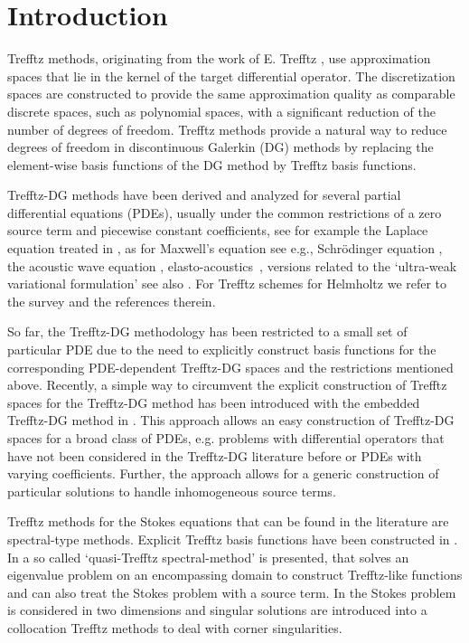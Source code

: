 \documentclass[pdflatex,sn-mathphys,Numbered]{sn-jnl}%
\theoremstyle{remark}%
\theoremstyle{definition}%
\begin{document}
\section{Introduction}
Trefftz methods, originating from the work of E. Trefftz
\cite{trefftz1926}, use approximation spaces that lie in the kernel of
the target differential operator. The discretization spaces are
constructed to provide the same approximation quality as comparable
discrete spaces, such as polynomial spaces, with a significant
reduction of the number of degrees of freedom. Trefftz methods provide
a natural way to reduce degrees of freedom in discontinuous Galerkin
(DG) methods by replacing the element-wise basis functions of the DG
method by Trefftz basis functions. 

Trefftz-DG methods have been derived and analyzed for several partial
differential equations (PDEs), usually under the common restrictions of
a zero source term and piecewise constant coefficients, see for
example the Laplace equation treated in \cite{HMPS14},
as
for Maxwell's equation see e.g.\cite{EKSW15, Huttunen}, Schr\"odinger
equation \cite{2306.09571,21M1426079}, the acoustic wave equation
\cite{mope18,bgl2016}, elasto-acoustics~\cite{bcds20}, versions
related to the `ultra-weak variational formulation' see also
\cite{SpaceTimeTDG,mope18,bcds20,KSTW2014,EKSW15,tpwave}.
For Trefftz schemes for Helmholtz we refer to the survey
\cite{TrefftzSurvey} and the references therein.

So far, the Trefftz-DG methodology has been restricted to a small set
of particular PDE due to the need to explicitly construct basis
functions for the corresponding PDE-dependent Trefftz-DG spaces and
the restrictions mentioned above.  
Recently, a simple way to circumvent the explicit construction of
Trefftz spaces for the Trefftz-DG method has been introduced with the
embedded Trefftz-DG method in \cite{2201.07041}. This approach allows
an easy construction of Trefftz-DG spaces for a broad class of PDEs,
e.g. problems with differential operators that have not been
considered in the Trefftz-DG literature before or PDEs with varying
coefficients. Further, the approach allows for a generic construction
of particular solutions to handle inhomogeneous source terms.

Trefftz methods for the Stokes equations that can be found in the
literature are spectral-type methods. Explicit Trefftz basis functions
have been constructed in \cite{POITOU2000561,Bouberbachene}. In
\cite{LifitsQTSM} a so called `quasi-Trefftz spectral-method' is
presented, that solves an eigenvalue problem on an encompassing domain
to construct Trefftz-like functions and can also treat the Stokes
problem with a source term. In \cite{21710} the Stokes problem is
considered in two dimensions and singular solutions are introduced
into a collocation Trefftz methods to deal with corner singularities.
\end{document}
